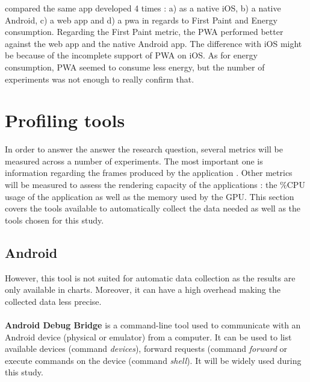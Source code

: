     \cite{PWAapplicability} compared the same app developed 4 times : a) as a native iOS, b) a native Android, c) a web app and d) a pwa in regards to First Paint and Energy consumption. Regarding the First Paint metric, the PWA performed better against the web app and the native Android app. The difference with iOS might be because of the incomplete support of PWA on iOS. As for energy consumption, PWA seemed to consume less energy, but the number of experiments was not enough to really confirm that.

\section{Profiling tools}

In order to answer the answer the research question, several metrics will be measured across a number of experiments. The most important one is information regarding the frames produced by the application
. Other metrics will be measured to assess the rendering capacity of the applications : the \%CPU usage of the application as well as the memory used by the GPU. This section covers the tools available to automatically collect the data needed as well as the tools chosen for this study.  


\subsection{Android}
However, this tool is not suited for automatic data collection as the results are only available in charts. Moreover, it can have a high overhead \cite{nanoscope} making the collected data less precise.

\paragraph{}
\textbf{Android Debug Bridge} \cite{adb} is a command-line tool used to communicate with an Android device (physical or emulator) from a computer. It can be used to list available devices (command \textit{devices}), forward requests (command \textit{forward} or execute commands on the device (command \textit{shell}). It will be widely used during this study. 

